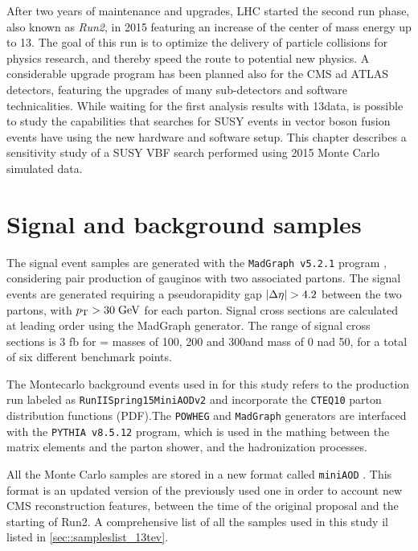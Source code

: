 

After two years of maintenance and upgrades, LHC started the second run phase, also known as \textit{Run2}, in 2015 featuring an increase of the center of mass energy up to 13\tev. The goal of this run is to optimize the delivery of particle collisions for physics research, and thereby speed the route to potential new physics. A considerable upgrade program has been planned also for the CMS ad ATLAS detectors, featuring the upgrades of many sub-detectors and software technicalities. While waiting for the first analysis results with 13\tev data, is possible to study the capabilities that searches for SUSY events in vector boson fusion events have using the new hardware and software setup. This chapter describes a sensitivity study of a SUSY VBF search performed using 2015 Monte Carlo simulated data.

\section{Signal and background samples}

The signal event samples are generated with the \texttt{MadGraph v5.2.1} program \cite{Alwall:2011uj}, considering pair production of gauginos with two associated partons. The signal events are generated requiring a pseudorapidity gap $|\Delta\eta| > 4.2$ between the two partons, with $p_{\text{T}} > 30\;\text{Ge}\kern-0.06667em\text{V}$ for each parton. Signal cross sections are calculated at leading order using the MadGraph generator. The range of signal cross sections is $3$ fb for \charginopm = \neutralinotwo masses of 100, 200 and 300\gev and \neutralinoone mass of 0 nad 50\gev, for a total of six different benchmark points.

The Montecarlo background events used in for this study refers to the production run labeled as \texttt{RunIISpring15MiniAODv2} and incorporate the \texttt{CTEQ10} \cite{Dulat:2013hea} parton distribution functions (PDF).The \texttt{POWHEG} and \texttt{MadGraph} generators are interfaced with the \texttt{PYTHIA v8.5.12} \cite{Sjostrand:2006za} program, which is used in the mathing between the matrix elements and the parton shower, and the hadronization processes. 

All the Monte Carlo samples are stored in a new format called \texttt{miniAOD} \cite{bib:WorkBookMiniAOD}. This format is an updated version of the previously used one in order to account new CMS reconstruction features, between the time of the original proposal and the starting of Run2. A comprehensive list of all the samples used in this study il listed in \autoref{sec::sampleslist_13tev}.

